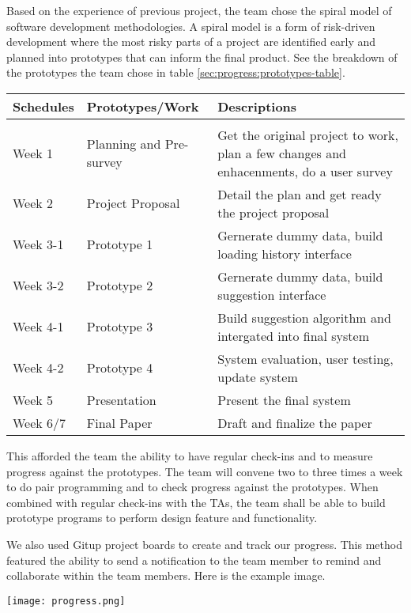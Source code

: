 Based on the experience of previous project, the team chose the spiral model
of software development methodologies. A spiral model is a form of 
risk-driven development where the most risky parts of a project are 
identified early and planned into prototypes that can inform the final 
product. See the breakdown of the prototypes the team chose in table \ref{sec:progress:prototypes-table}.

\begin{table*}[!htbp]
\caption{Prototypes and Schedules}
\label{sec:progress:prototypes-table}
\begin{center}
\begin{tabular}{  l  l p{10cm} }
	\bf Schedules & \bf Prototypes/Work & \bf Descriptions\\ \hline \\
	Week 1 & Planning and Pre-survey & Get the original project to work, plan a few changes and enhacenments, do a user survey\\
	Week 2 & Project Proposal & Detail the plan and get ready the project proposal\\
	Week 3-1 & Prototype 1 & Gernerate dummy data, build loading history interface\\
	Week 3-2 & Prototype 2 & Gernerate dummy data, build suggestion interface\\
	Week 4-1 & Prototype 3 & Build suggestion algorithm and intergated into final system \\
	Week 4-2 & Prototype 4 & System evaluation, user testing, update system \\
	Week 5 & Presentation & Present the final system \\
	Week 6/7 & Final Paper & Draft and finalize the paper \\
\end{tabular}
\end{center}
\end{table*}


This afforded the team the ability to have regular check-ins and to measure
progress against the prototypes. The team will convene two to three times 
a week to do pair programming and to check progress against the prototypes.
When combined with regular check-ins with the TAs, the team shall be able 
to build prototype programs to perform design feature and functionality.

We also used Gitup project boards to create and track our progress. This 
method featured the ability to send a notification to the team member to 
remind and collaborate within the team members. Here is the example image.

\begin{table}[ht]
\caption{Progress Tracking Board}
\label{section:progress:tracking-board}
\centering
\texttt{[image: progress.png]}
\end{table}